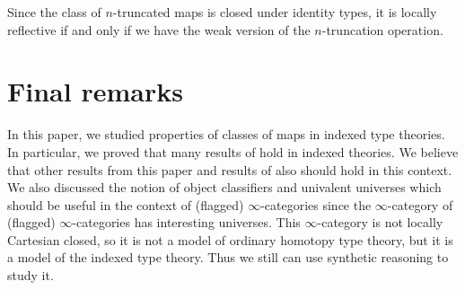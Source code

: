 \documentclass[reqno]{mscs}
\numberwithin{figure}{section}
\begin{document}
\begin{example}
Since the class of $n$-truncated maps is closed under identity types, it is locally reflective if and only if we have the weak version of the $n$-truncation operation.
\end{example}

\section{Final remarks}

In this paper, we studied properties of classes of maps in indexed type theories.
In particular, we proved that many results of \cite{modality-hott} hold in indexed theories.
We believe that other results from this paper and results of \cite{localization-hott} also should hold in this context.
We also discussed the notion of object classifiers and univalent universes which should be useful in the context of (flagged) $\infty$-categories
since the $\infty$-category of (flagged) $\infty$-categories has interesting universes.
This $\infty$-category is not locally Cartesian closed, so it is not a model of ordinary homotopy type theory, but it is a model of the indexed type theory.
Thus we still can use synthetic reasoning to study it.
\end{document}
